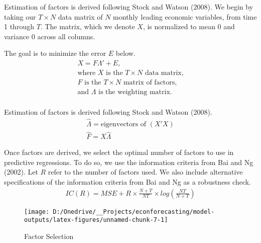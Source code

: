 \documentclass[11pt, letterpaper]{article}\usepackage[]{graphicx}\usepackage[]{color}
\begin{document}
Estimation of factors is derived following Stock and Watson (2008). We begin by taking our $T \times N$ data matrix of $N$ monthly leading economic variables, from time 1 through $T$. The matrix, which we denote $X$, is normalized to mean 0 and variance 0 across all columns.

The goal is to minimize the error $E$ below.
\begin{align*}
	X = F  \Lambda ' + E,\\
	\text{where $X$ is the $T \times N$ data matrix,}\\
	\text{$F$ is the $T \times N$ matrix of factors,}\\
	\text{and $\Lambda$ is the weighting matrix.}\\
\end{align*}

Estimation of factors is derived following Stock and Watson (2008).
\begin{align*}
	\widehat{\Lambda} = \text{eigenvectors of } (X'X)\\
	\widehat{F} = X \widehat{\Lambda}
\end{align*}



Once factors are derived, we select the optimal number of factors to use in predictive regressions. To do so, we use the information criteria from Bai and Ng (2002). Let $R$ refer to the number of factors used. We also include alternative specifications of the information criteria from Bai and Ng as a robustness check.
\begin{align*}
	IC(R) = MSE + R \times \frac{N+T}{NT} \times log\left(\frac{NT}{N+T}\right)
\end{align*}

\begin{figure}[H]

{\centering \texttt{[image: D:/Onedrive/\_\_Projects/econforecasting/model-outputs/latex-figures/unnamed-chunk-7-1]} 

}

\caption[Factor Selection]{Factor Selection}\label{fig:unnamed-chunk-7}
\end{figure}
\end{document}
